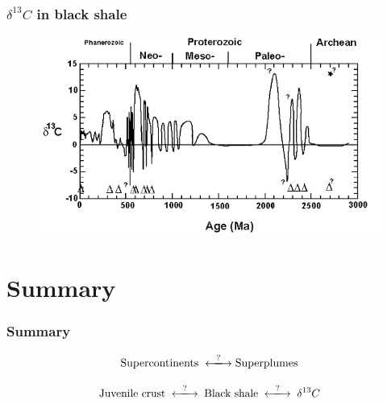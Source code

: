 \documentclass{beamer}
\begin{document}
        \begin{frame}
        \frametitle{$\delta^{13} C$ in black shale}
        \begin{figure}
        \begin{center}
                \includegraphics[width=\textwidth]{shale_carbon.png}
        \end{center}
        \end{figure}
        \end{frame}

        \section{Summary}
        \begin{frame}
        \frametitle{Summary}
        \[
        \text{Supercontinents} \;\xlongleftrightarrow{ ? } \text{Superplumes}
        \]

        \[
        \text{Juvenile crust} \;\xlongleftrightarrow{ ? }\; \text{Black shale} \;\xlongleftrightarrow{ ? }\; \delta^{13} C
        \]

        \end{frame}
        
\end{document}
